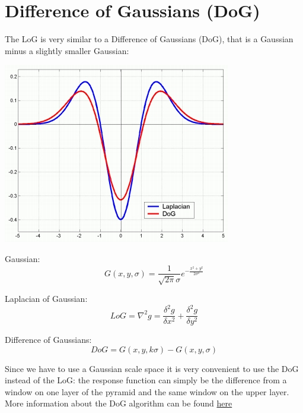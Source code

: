 \documentclass{article}
\begin{document}
\newpage

\section*{Difference of Gaussians (DoG)}

The LoG is very similar to a Difference of Gaussians (DoG), that is a Gaussian minus a slightly smaller Gaussian:
\begin{center}
    \includegraphics[width=.6\linewidth]{images/log_dog.jpg}
\end{center}

Gaussian:
\begin{equation*}
    G(x,y,\sigma) = \frac{1}{\sqrt{2\pi }\sigma}e^{-\frac{x^2+y^2}{2\sigma^2}}
\end{equation*}

Laplacian of Gaussian:
\begin{equation*}
    LoG = \nabla^2g = \frac{\delta^2g}{\delta x^2} + \frac{\delta^2g}{\delta y^2} 
\end{equation*}

Difference of Gaussians:
\begin{equation*}
    DoG = G(x,y,k\sigma) - G(x,y,\sigma)    
\end{equation*}

Since we have to use a Gaussian scale space it is very convenient to use the DoG instead of the LoG: the response function can simply be the difference from a window on one layer of the pyramid and the same window on the upper layer. More information about the DoG algorithm can be found \href{https://medium.com/@vad710/cv-for-busy-devs-improving-features-df20c3aa5887#:~:text=The%20Difference%20of%20Gaussian%20(DoG)%20technique%20is%20a%20highly%20influential,adjacent%20images%20from%20each%20other.}{here}
\end{document}
